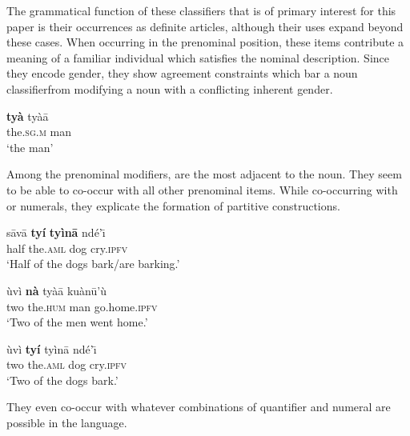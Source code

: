 \documentclass[output=paper,modfonts,nonflat]{langsci/langscibook}
\begin{document}
The grammatical function of these classifiers that is of primary interest for this paper is their occurrences as definite articles, although their uses expand beyond these cases.  When occurring in the prenominal position, these items contribute a meaning of a familiar individual which satisfies the nominal description.  Since they encode gender, they show agreement constraints which bar a noun classifier\largerpage from modifying a noun with a conflicting inherent gender.

\ea {}\label{ex:cisneros:44}
\gll
\textbf{ty\`a} ty\`a\=a\\
the.\textsc{sg.m} man\\
\glt
`the man'
\z 

\z 

Among the prenominal modifiers,  are the most adjacent to the noun.  They seem to be able to co-occur with all other prenominal items.  While co-occurring with  or numerals, they explicate the formation of partitive constructions.

\ea {}\label{ex:cisneros:46}
\gll
{\ob}s\=av\=a \textbf{ty\'i} \textbf{ty\`in\=a}{\cb} nd\'e'\=\i\\
{\db}half the.\textsc{aml} dog cry.\textsc{ipfv}\\
\glt
`Half of the dogs bark/are barking.'
\z 

\ea {}\label{ex:cisneros:47}
\gll
{\ob}\`uv\`i \textbf{n\`a} ty\`a\=a{\cb} ku\`an\=u'\`u\\
{\db}two the.\textsc{hum} man go.home.\textsc{ipfv}\\
\glt
`Two of the men went home.'
\z 

\ea {}\label{ex:cisneros:48}
\gll
{\ob}\`uv\`i \textbf{ty\'i} ty\`in\=a{\cb} nd\'e'\=\i\\
{\db}two the.\textsc{aml} dog cry.\textsc{ipfv}\\
\glt
`Two of the dogs bark.'
\z 

They even co-occur with whatever combinations of quantifier and numeral are possible in the language.

\z 
\end{document}

